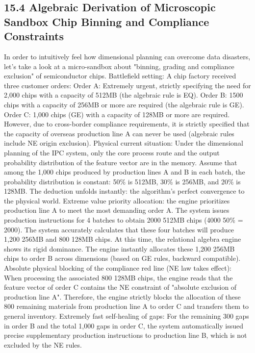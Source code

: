 \documentclass[11pt,a4paper]{article}
\begin{document}
\subsection*{15.4 Algebraic Derivation of Microscopic Sandbox Chip Binning and Compliance Constraints}


In order to intuitively feel how dimensional planning can overcome data disasters, let's take a look at a micro-sandbox about "binning, grading and compliance exclusion" of semiconductor chips. Battlefield setting: A chip factory received three customer orders: Order A: Extremely urgent, strictly specifying the need for 2,000 chips with a capacity of 512MB (the algebraic rule is EQ). Order B: 1500 chips with a capacity of 256MB or more are required (the algebraic rule is GE). Order C: 1,000 chips (GE) with a capacity of 128MB or more are required. However, due to cross-border compliance requirements, it is strictly specified that the capacity of overseas production line A can never be used (algebraic rules include NE origin exclusion). Physical current situation: Under the dimensional planning of the IPC system, only the core process route and the output probability distribution of the feature vector are in the memory. Assume that among the 1,000 chips produced by production lines A and B in each batch, the probability distribution is constant: 50\% is 512MB, 30\% is 256MB, and 20\% is 128MB. The deduction unfolds instantly: the algorithm’s perfect convergence to the physical world. Extreme value priority allocation: the engine prioritizes production line A to meet the most demanding order A. The system issues production instructions for 4 batches to obtain 2000 512MB chips (4000 50\% = 2000). The system accurately calculates that these four batches will produce 1,200 256MB and 800 128MB chips. At this time, the relational algebra engine shows its rigid dominance. The engine instantly allocates these 1,200 256MB chips to order B across dimensions (based on GE rules, backward compatible). Absolute physical blocking of the compliance red line (NE law takes effect): When processing the associated 800 128MB chips, the engine reads that the feature vector of order C contains the NE constraint of "absolute exclusion of production line A". Therefore, the engine strictly blocks the allocation of these 800 remaining materials from production line A to order C and transfers them to general inventory. Extremely fast self-healing of gaps: For the remaining 300 gaps in order B and the total 1,000 gaps in order C, the system automatically issued precise supplementary production instructions to production line B, which is not excluded by the NE rules.
\end{document}
